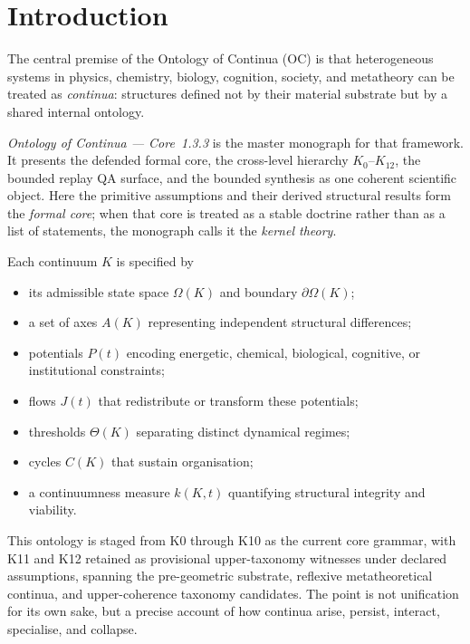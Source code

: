 
\section{Introduction}
\label{sec:intro}

The central premise of the Ontology of Continua (OC) is that heterogeneous
systems in physics, chemistry, biology, cognition, society, and metatheory can
be treated as \emph{continua}: structures defined
not by their material substrate but by a shared internal ontology.

\emph{Ontology of Continua --- Core~1.3.3} is the master monograph for that
framework. It presents the defended formal core, the cross-level hierarchy
\(K_0\)–\(K_{12}\), the bounded replay QA surface, and the bounded synthesis as one coherent scientific object.
Here the primitive assumptions and their derived structural results form the
\emph{formal core}; when that core is treated as a stable doctrine rather than
as a list of statements, the monograph calls it the \emph{kernel theory}.

Each continuum \(K\) is specified by

\begin{itemize}
    \item its admissible state space \(\Omega(K)\) and boundary \(\partial\Omega(K)\);
    \item a set of axes \(A(K)\) representing independent structural differences;
    \item potentials \(P(t)\) encoding energetic, chemical, biological, cognitive, or institutional constraints;
    \item flows \(J(t)\) that redistribute or transform these potentials;
    \item thresholds \(\Theta(K)\) separating distinct dynamical regimes;
    \item cycles \(C(K)\) that sustain organisation;
    \item a continuumness measure \(k(K,t)\) quantifying structural integrity and viability.
\end{itemize}

This ontology is staged from K0 through K10 as the current core grammar, with K11 and K12 retained as provisional upper-taxonomy witnesses under declared assumptions, spanning the
pre-geometric substrate, reflexive metatheoretical continua, and
upper-coherence taxonomy candidates. The point is
not unification for its own sake, but a precise account of how continua arise,
persist, interact, specialise, and collapse.

